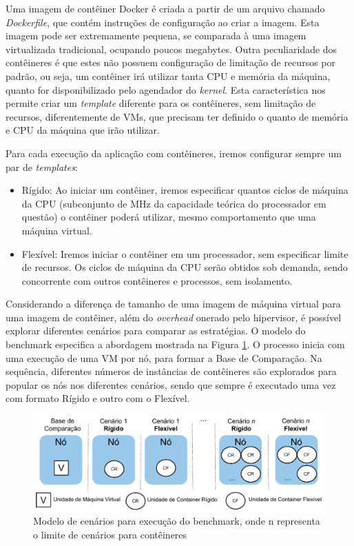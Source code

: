 \documentclass[twoside,english,brazilian]{UNISINOSartigo}
\begin{document}
Uma imagem de contêiner Docker é criada a partir de um arquivo chamado \textit{Dockerfile}, que contém instruções de configuração ao criar a imagem. Esta imagem pode ser extremamente pequena, se comparada à uma imagem virtualizada tradicional, ocupando poucos megabytes. Outra peculiaridade dos contêineres é que estes não possuem configuração de limitação de recursos por padrão, ou seja, um contêiner irá utilizar tanta CPU e memória da máquina, quanto for disponibilizado pelo agendador do \textit{kernel}. Esta característica nos permite criar um \textit{template} diferente para os contêineres, sem limitação de recursos, diferentemente de VMs, que precisam ter definido o quanto de memória e CPU da máquina que irão utilizar. 

Para cada execução da aplicação com contêineres, iremos configurar sempre um par de \textit{templates}:
\begin{itemize}
	\item Rígido: Ao iniciar um contêiner, iremos especificar quantos ciclos de máquina da CPU (subconjunto de MHz da capacidade teórica do processador em questão) o contêiner poderá utilizar, mesmo comportamento que uma máquina virtual.
	\item Flexível: Iremos iniciar o contêiner em um processador, sem especificar limite de recursos. Os ciclos de máquina da CPU serão obtidos sob demanda, sendo concorrente com outros contêineres e processos, sem isolamento. 
\end{itemize} 

Considerando a diferença de tamanho de uma imagem de máquina virtual para uma imagem de contêiner, além do \textit{overhead} onerado pelo hipervisor, é possível explorar diferentes cenários para comparar as estratégias. O modelo do benchmark especifica a abordagem mostrada na Figura \ref{fig:modelo}. O processo inicia com uma execução de uma VM por nó, para formar a Base de Comparação. Na sequência, diferentes números de instâncias de contêineres são explorados para popular os nós nos diferentes cenários, sendo que sempre é executado uma vez com formato Rígido e outro com o Flexível.

\begin{figure}[ht!]
	\caption{Modelo de cenários para execução do benchmark, onde n representa o limite de cenários para contêineres}
	\label{fig:modelo}
	\centering%
	\vspace{-0.75\baselineskip}
	\begin{minipage}{0.7\textwidth}
		\includegraphics[width=\textwidth]{images/cropped_cenarios}
	\end{minipage}
\end{figure}
\end{document}
